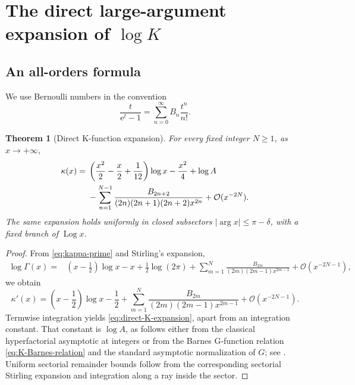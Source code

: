 \documentclass[11pt,a4paper]{article}
\numberwithin{equation}{section}
\newtheorem{theorem}{Theorem}[section]
\theoremstyle{remark}
\DeclareMathOperator{\Log}{Log}
\newcommand{\e}{\mathrm e}
\newcommand{\bigO}{\mathcal O}
\begin{document}
\section{The direct large-argument expansion of \texorpdfstring{$\log K$}{log K}}
\label{sec:direct-asymptotic}

\subsection{An all-orders formula}

We use Bernoulli numbers in the convention
\[
\frac{t}{\e^t-1}=\sum_{n=0}^{\infty}B_n\frac{t^n}{n!}.
\]

\begin{theorem}[Direct K-function expansion]
\label{thm:direct-K-expansion}
For every fixed integer \(N\ge1\), as \(x\to+\infty\),
\begin{align}
\kappa(x)
={}&\left(\frac{x^2}{2}-\frac{x}{2}+\frac1{12}\right)\log x
-\frac{x^2}{4}+\log A
\notag\\
&-\sum_{n=1}^{N-1}
\frac{B_{2n+2}}{(2n)(2n+1)(2n+2)x^{2n}}
+\bigO(x^{-2N}).
\label{eq:direct-K-expansion}
\end{align}
The same expansion holds uniformly in closed subsectors
\(|\arg x|\le\pi-\delta\), with a fixed branch of \(\Log x\).
\end{theorem}

\begin{proof}
From \cref{eq:kappa-prime} and Stirling's expansion,
\begin{align*}
\log\Gamma(x)
={}&\left(x-\frac12\right)\log x-x+\frac12\log(2\pi)
+\sum_{m=1}^{N}
\frac{B_{2m}}{(2m)(2m-1)x^{2m-1}}
+\bigO(x^{-2N-1}),
\end{align*}
we obtain
\begin{equation}
\kappa'(x)=\left(x-\frac12\right)\log x-\frac12
+\sum_{m=1}^{N}
\frac{B_{2m}}{(2m)(2m-1)x^{2m-1}}
+\bigO(x^{-2N-1}).
\label{eq:kappa-prime-stirling}
\end{equation}
Termwise integration yields \cref{eq:direct-K-expansion}, apart from an
integration constant.  That constant is \(\log A\), as follows either from
the classical hyperfactorial asymptotic at integers or from the Barnes
G-function relation \cref{eq:K-Barnes-relation} and the standard asymptotic
normalization of \(G\); see \cite{DLMFBarnesG}.  Uniform sectorial remainder
bounds follow from the corresponding sectorial Stirling expansion and
integration along a ray inside the sector.
\end{proof}
\end{document}
